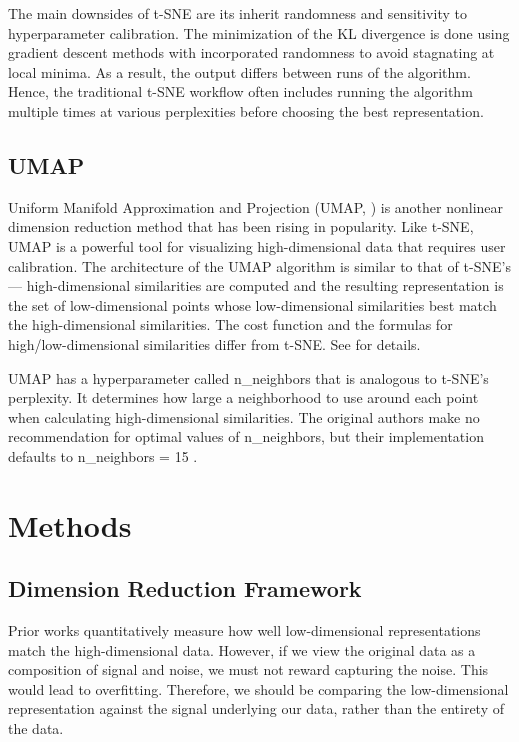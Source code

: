 \documentclass{article}
\begin{document}
The main downsides of t-SNE are its inherit randomness and sensitivity to hyperparameter calibration. The minimization of the KL divergence is done using gradient descent methods with incorporated randomness to avoid stagnating at local minima. As a result, the output differs between runs of the algorithm. Hence, the traditional t-SNE workflow often includes running the algorithm multiple times at various perplexities before choosing the best representation.

\subsection{UMAP}
Uniform Manifold Approximation and Projection (UMAP, \cite{umap}) is another nonlinear dimension reduction method that has been rising in popularity. Like t-SNE, UMAP is a powerful tool for visualizing high-dimensional data that requires user calibration. The architecture of the UMAP algorithm is similar to that of t-SNE's --- high-dimensional similarities are computed and the resulting representation is the set of low-dimensional points whose low-dimensional similarities best match the high-dimensional similarities. The cost function and the formulas for high/low-dimensional similarities differ from t-SNE. See \cite{umap} for details.

UMAP has a hyperparameter called n\_neighbors that is analogous to t-SNE's perplexity. It determines how large a neighborhood to use around each point when calculating high-dimensional similarities. The original authors make no recommendation for optimal values of n\_neighbors, but their implementation defaults to n\_neighbors = 15 \cite{umap}.

\section{Methods}

\subsection{Dimension Reduction Framework}
Prior works quantitatively measure how well low-dimensional representations match the high-dimensional data. However, if we view the original data as a composition of signal and noise, we must not reward capturing the noise. This would lead to overfitting. Therefore, we should be comparing the low-dimensional representation against the signal underlying our data, rather than the entirety of the data.
\end{document}
